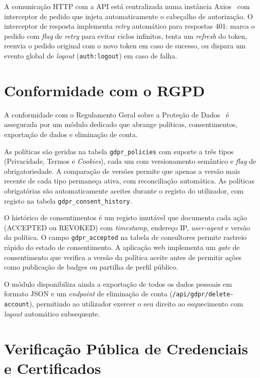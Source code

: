 \documentclass[12pt,a4paper]{report}
\begin{document}
A comunicação HTTP com a API está centralizada numa instância Axios~\cite{axios} com interceptor de pedido que injeta automaticamente o cabeçalho de autorização. O interceptor de resposta implementa \textit{retry} automático para respostas 401: marca o pedido com \textit{flag} de \textit{retry} para evitar ciclos infinitos, tenta um \textit{refresh} do token, reenvia o pedido original com o novo token em caso de sucesso, ou dispara um evento global de \textit{logout} (\texttt{auth:logout}) em caso de falha.

\section{Conformidade com o RGPD}

A conformidade com o Regulamento Geral sobre a Proteção de Dados~\cite{rgpd} é assegurada por um módulo dedicado que abrange políticas, consentimentos, exportação de dados e eliminação de conta.

As políticas são geridas na tabela \texttt{gdpr\_policies} com suporte a três tipos (Privacidade, Termos e \textit{Cookies}), cada um com versionamento semântico e \textit{flag} de obrigatoriedade. A comparação de versões permite que apenas a versão mais recente de cada tipo permaneça ativa, com reconciliação automática. As políticas obrigatórias são automaticamente aceites durante o registo do utilizador, com registo na tabela \texttt{gdpr\_consent\_history}.

O histórico de consentimentos é um registo imutável que documenta cada ação (ACCEPTED ou REVOKED) com \textit{timestamp}, endereço IP, \textit{user-agent} e versão da política. O campo \texttt{gdpr\_accepted} na tabela de consultores permite rastreio rápido do estado de consentimento. A aplicação web implementa um \textit{gate} de consentimento que verifica a versão da política aceite antes de permitir ações como publicação de badges ou partilha de perfil público.

O módulo disponibiliza ainda a exportação de todos os dados pessoais em formato JSON e um \textit{endpoint} de eliminação de conta (\texttt{/api/gdpr/delete-account}), permitindo ao utilizador exercer o seu direito ao esquecimento com \textit{logout} automático subsequente.

\section{Verificação Pública de Credenciais e Certificados}
\end{document}

